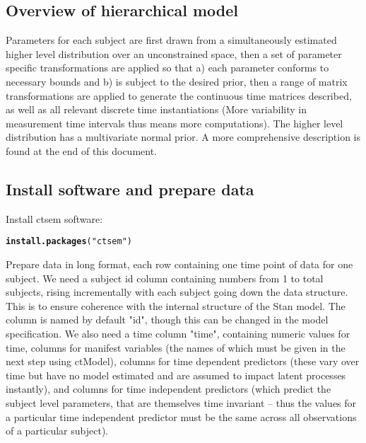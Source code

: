 \documentclass[nojss]{jss}\usepackage[]{graphicx}\usepackage[]{color}
\makeatletter
\newcommand{\hlstr}[1]{\textcolor[rgb]{0.192,0.494,0.8}{#1}}%
\newcommand{\hlstd}[1]{\textcolor[rgb]{0.345,0.345,0.345}{#1}}%
\newcommand{\hlkwd}[1]{\textcolor[rgb]{0.737,0.353,0.396}{\textbf{#1}}}%
\newenvironment{kframe}{%
 \def\at@end@of@kframe{}%
 \ifinner\ifhmode%
  \def\at@end@of@kframe{\end{minipage}}%
  \begin{minipage}{\columnwidth}%
 \fi\fi%
 \def\FrameCommand##1{\hskip\@totalleftmargin \hskip-\fboxsep
 \colorbox{shadecolor}{##1}\hskip-\fboxsep
     \hskip-\linewidth \hskip-\@totalleftmargin \hskip\columnwidth}%
 \MakeFramed {\advance\hsize-\width
   \@totalleftmargin\z@ \linewidth\hsize
   \@setminipage}}%
 {\par\unskip\endMakeFramed%
 \at@end@of@kframe}
\newenvironment{knitrout}{}{} %
\makeatother
\begin{document}
\subsection{Overview of hierarchical model}
Parameters for each subject are first drawn from a simultaneously estimated higher level distribution over an unconstrained space, then a set of parameter specific transformations are applied so that a) each parameter conforms to necessary bounds and b) is subject to the desired prior, then a range of matrix transformations are applied to generate the continuous time matrices described, as well as all relevant discrete time instantiations (More variability in measurement time intervals thus means more computations). The higher level distribution has a multivariate normal prior. A more comprehensive description is found at the end of this document. 

\subsection{Install software and prepare data}
Install ctsem software:

\begin{knitrout}\small
{}\color{fgcolor}\begin{kframe}
\begin{alltt}
\hlkwd{install.packages}\hlstd{(}\hlstr{"ctsem"}\hlstd{)}
\end{alltt}
\end{kframe}
\end{knitrout}

Prepare data in long format, each row containing one time point of data for one subject. We need a subject id column containing numbers from 1 to total subjects, rising incrementally with each subject going down the data structure. This is to ensure coherence with the internal structure of the Stan model. The column is named by default "id", though this can be changed in the model specification. We also need a time column "time", containing numeric values for time, columns for manifest variables (the names of which must be given in the next step using ctModel), columns for time dependent predictors (these vary over time but have no model estimated and are assumed to impact latent processes instantly), and columns for time independent predictors (which predict the subject level parameters, that are themselves time invariant -- thus the values for a particular time independent predictor must be the same across all observations of a particular subject).
\end{document}
